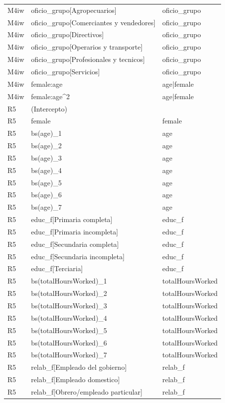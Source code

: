 \begin{longtable}{lll}
M4iw & oficio\_grupo[Agropecuarios] & oficio\_grupo \\
M4iw & oficio\_grupo[Comerciantes y vendedores] & oficio\_grupo \\
M4iw & oficio\_grupo[Directivos] & oficio\_grupo \\
M4iw & oficio\_grupo[Operarios y transporte] & oficio\_grupo \\
M4iw & oficio\_grupo[Profesionales y tecnicos] & oficio\_grupo \\
M4iw & oficio\_grupo[Servicios] & oficio\_grupo \\
M4iw & female:age & age|female \\
M4iw & female:age\textasciicircum 2 & age|female \\
R5 & (Intercepto) &  \\
R5 & female & female \\
R5 & bs(age)\_1 & age \\
R5 & bs(age)\_2 & age \\
R5 & bs(age)\_3 & age \\
R5 & bs(age)\_4 & age \\
R5 & bs(age)\_5 & age \\
R5 & bs(age)\_6 & age \\
R5 & bs(age)\_7 & age \\
R5 & educ\_f[Primaria completa] & educ\_f \\
R5 & educ\_f[Primaria incompleta] & educ\_f \\
R5 & educ\_f[Secundaria completa] & educ\_f \\
R5 & educ\_f[Secundaria incompleta] & educ\_f \\
R5 & educ\_f[Terciaria] & educ\_f \\
R5 & bs(totalHoursWorked)\_1 & totalHoursWorked \\
R5 & bs(totalHoursWorked)\_2 & totalHoursWorked \\
R5 & bs(totalHoursWorked)\_3 & totalHoursWorked \\
R5 & bs(totalHoursWorked)\_4 & totalHoursWorked \\
R5 & bs(totalHoursWorked)\_5 & totalHoursWorked \\
R5 & bs(totalHoursWorked)\_6 & totalHoursWorked \\
R5 & bs(totalHoursWorked)\_7 & totalHoursWorked \\
R5 & relab\_f[Empleado del gobierno] & relab\_f \\
R5 & relab\_f[Empleado domestico] & relab\_f \\
R5 & relab\_f[Obrero/empleado particular] & relab\_f \\

\end{longtable}
